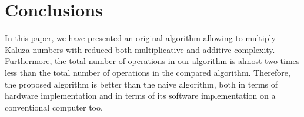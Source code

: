 \documentclass{jtacs}
\numberwithin{equation}{section}
\begin{document}
\section{Conclusions}

In this paper, we have presented an original algorithm allowing to multiply Kaluza numbers with reduced both multiplicative and additive complexity. Furthermore, the total number of operations in our algorithm is almost two times less than the total number of operations in the compared algorithm. Therefore, the proposed algorithm is better than the naive algorithm, both in terms of hardware implementation and in terms of its software implementation on a conventional computer too.
\\
\\
\\
\\
\end{document}
